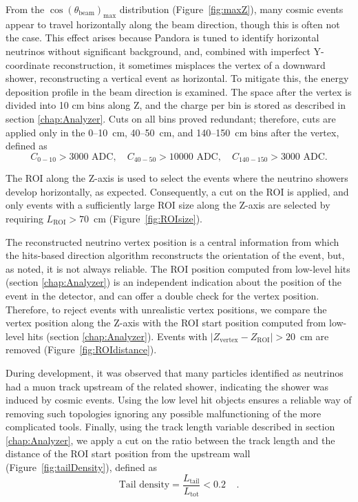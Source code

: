 From the $\cos(\theta_{\mathrm{beam}})_{\text{max}}$ distribution (Figure~\ref{fig:maxZ}), many cosmic events appear to travel horizontally along the beam direction, though this is often not the case. This effect arises because Pandora is tuned to identify horizontal neutrinos without significant background, and, combined with imperfect Y-coordinate reconstruction, it sometimes misplaces the vertex of a downward shower, reconstructing a vertical event as horizontal.
To mitigate this, the energy deposition profile in the beam direction is examined. The space after the vertex is divided into 10 cm bins along Z, and the charge per bin is stored as described in section \ref{chap:Analyzer}.
Cuts on all bins proved redundant; therefore, cuts are applied only in the 0–10~cm, 40–50~cm, and 140–150~cm bins after the vertex, defined as
$$
C_{0-10}>3000 \text{~ADC}, \quad C_{40-50}>10000\text{~ADC}, \quad C_{140-150}>3000\text{~ADC}.
$$

The ROI along the Z-axis is used to select the events where the neutrino showers develop horizontally, as expected. Consequently, a cut on the ROI is applied, and only events with a sufficiently large ROI size along the Z-axis are selected by requiring $L_{\text{ROI}} > 70$~cm (Figure~\ref{fig:ROIsize}).

The reconstructed neutrino vertex position is a central information from which the hits-based direction algorithm reconstructs the orientation of the event, but, as noted, it is not always reliable.
The ROI position computed from low-level hits (section \ref{chap:Analyzer}) is an independent indication about the position of the event in the detector, and can offer a double check for the vertex position. Therefore, to reject events with unrealistic vertex positions, we compare the vertex position along the Z-axis with the ROI start position computed from low-level hits (section \ref{chap:Analyzer}).
Events with $\lvert Z_{\text{vertex}} - Z_{\text{ROI}} \rvert > 20$~cm are removed (Figure~\ref{fig:ROIdistance}).

During development, it was observed that many particles identified as neutrinos had a muon track upstream of the related shower, indicating the shower was induced by cosmic events. Using the low level hit objects ensures a reliable way of removing such topologies ignoring any possible malfunctioning of the more complicated tools.
Finally, using the track length variable described in section \ref{chap:Analyzer}, we apply a cut on the ratio between the track length and the distance of the ROI start position from the upstream wall (Figure~\ref{fig:tailDensity}), defined as $$\text{Tail density} = \frac{L_{\text{tail}}}{L_{\text{tot}}} < 0.2~~~~~.$$




